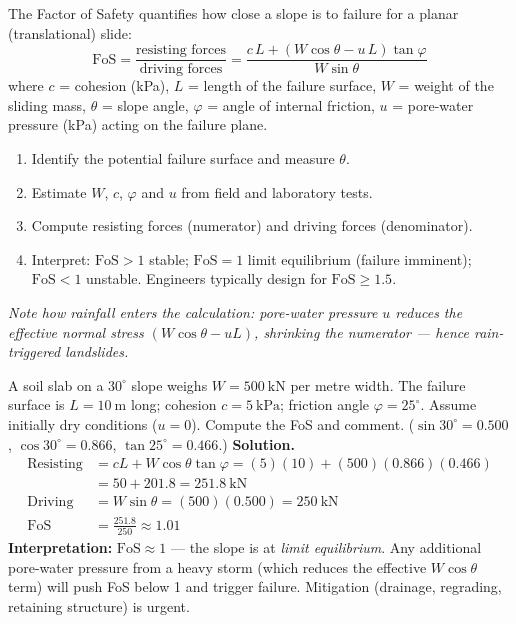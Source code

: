 \documentclass[11pt]{article}
\newcommand{\cle}[1]{{\popxbold\color{popdark}#1}}
\begin{document}
\begin{methode}
The \cle{Factor of Safety} quantifies how close a slope is to failure for a planar (translational) slide:
\[ \mathrm{FoS} = \frac{\text{resisting forces}}{\text{driving forces}} = \frac{c\,L + (W\cos\theta - u\,L)\tan\varphi}{W\sin\theta} \]
where $c$ = cohesion (\si{kPa}), $L$ = length of the failure surface, $W$ = weight of the sliding mass, $\theta$ = slope angle, $\varphi$ = angle of internal friction, $u$ = pore-water pressure (\si{kPa}) acting on the failure plane.
\begin{enumerate}
\item Identify the potential failure surface and measure $\theta$.
\item Estimate $W$, $c$, $\varphi$ and $u$ from field and laboratory tests.
\item Compute resisting forces (numerator) and driving forces (denominator).
\item Interpret: $\mathrm{FoS} > 1$ stable; $\mathrm{FoS} = 1$ limit equilibrium (failure imminent); $\mathrm{FoS} < 1$ unstable. Engineers typically design for $\mathrm{FoS} \geq 1.5$.
\end{enumerate}
\emph{Note how rainfall enters the calculation: pore-water pressure $u$ reduces the effective normal stress $(W\cos\theta - uL)$, shrinking the numerator — hence rain-triggered landslides.}
\end{methode}

\begin{exoresolu}
A soil slab on a $30^{\circ}$ slope weighs $W = 500\ \mathrm{kN}$ per metre width. The failure surface is $L = 10\ \mathrm{m}$ long; cohesion $c = 5\ \mathrm{kPa}$; friction angle $\varphi = 25^{\circ}$. Assume initially dry conditions ($u=0$). Compute the FoS and comment. ($\sin 30^{\circ} = 0.500$, $\cos 30^{\circ} = 0.866$, $\tan 25^{\circ} = 0.466$.)
\tcblower
\textbf{Solution.}
\begin{align*}
\text{Resisting} &= cL + W\cos\theta\tan\varphi = (5)(10) + (500)(0.866)(0.466) \\
&= 50 + 201.8 = 251.8\ \mathrm{kN}\\
\text{Driving} &= W\sin\theta = (500)(0.500) = 250\ \mathrm{kN}\\
\mathrm{FoS} &= \frac{251.8}{250} \approx 1.01
\end{align*}
\textbf{Interpretation:} $\mathrm{FoS} \approx 1$ — the slope is at \emph{limit equilibrium}. Any additional pore-water pressure from a heavy storm (which reduces the effective $W\cos\theta$ term) will push FoS below 1 and trigger failure. Mitigation (drainage, regrading, retaining structure) is urgent.
\end{exoresolu}
\end{document}
